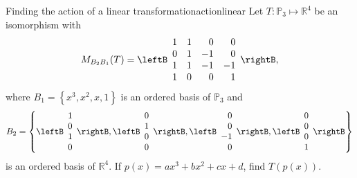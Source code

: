 \begin{example}{Finding the action of a linear transformation}{actionlinear}
Let $T: \mathbb{P}_3 \mapsto \mathbb{R}^4$ be an isomorphism with
\[
M_{B_2B_1}(T) = \leftB \begin{array}{rrrr}
1 & 1 & 0 & 0 \\
0 & 1 & -1 & 0 \\
1 & 1 & -1 & -1 \\
1 & 0 & 0 & 1 
\end{array} \rightB,
\]
where $B_1 = \left\{ x^3, x^2, x, 1 \right\}$ is an ordered basis of $\mathbb{P}_3$ and 
\[
B_2 = \left\{ \leftB \begin{array}{r}
1 \\
0 \\
1 \\
0
\end{array} \rightB, \leftB \begin{array}{r}
0 \\
1 \\
0 \\
0
\end{array} \rightB, 
\leftB \begin{array}{r}
0 \\
0 \\
-1 \\
0
\end{array} \rightB, 
\leftB \begin{array}{r}
0 \\
0 \\
0 \\
1
\end{array} \rightB \right\} 
\]
is an ordered basis of $\mathbb{R}^4$. If $p(x) = ax^3 + bx^2 + cx + d$, find $T(p(x))$. 
\end{example}

